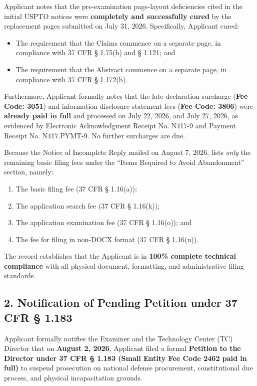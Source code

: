 \documentclass[11pt,letterpaper]{article}
\begin{document}
\noindent Applicant notes that the pre-examination page-layout deficiencies cited in the initial USPTO notices were \textbf{completely and successfully cured} by the replacement pages submitted on July 31, 2026. Specifically, Applicant cured:
\begin{itemize}
    \item The requirement that the Claims commence on a separate page, in compliance with 37 CFR \S{} 1.75(h) and \S{} 1.121; and
    \item The requirement that the Abstract commence on a separate page, in compliance with 37 CFR \S{} 1.172(b).
\end{itemize}

\noindent Furthermore, Applicant formally notes that the late declaration surcharge (\textbf{Fee Code: 3051}) and information disclosure statement fees (\textbf{Fee Code: 3806}) were \textbf{already paid in full} and processed on July 22, 2026, and July 27, 2026, as evidenced by Electronic Acknowledgment Receipt No. N417-9 and Payment Receipt No. N417.PYMT-9. No further surcharges are due.

\noindent Because the Notice of Incomplete Reply mailed on August 7, 2026, lists \textit{only} the remaining basic filing fees under the ``Items Required to Avoid Abandonment'' section, namely:
\begin{enumerate}
    \item The basic filing fee (37 CFR \S{} 1.16(a));
    \item The application search fee (37 CFR \S{} 1.16(k));
    \item The application examination fee (37 CFR \S{} 1.16(o)); and
    \item The fee for filing in non-DOCX format (37 CFR \S{} 1.16(u)).
\end{enumerate}
\noindent The record establishes that the Applicant is in \textbf{100\% complete technical compliance} with all physical document, formatting, and administrative filing standards.

\subsection*{2. Notification of Pending Petition under 37 CFR \S{} 1.183}

\noindent Applicant formally notifies the Examiner and the Technology Center (TC) Director that on \textbf{August 2, 2026}, Applicant filed a formal \textbf{Petition to the Director under 37 CFR \S{} 1.183 (Small Entity Fee Code 2462 paid in full)} to suspend prosecution on national defense procurement, constitutional due process, and physical incapacitation grounds.
\end{document}

